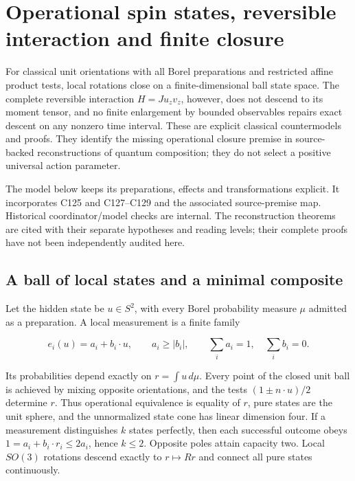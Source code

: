 \documentclass[11pt,a4paper]{article}
\begin{document}
\hypertarget{operational-spin-states-reversible-interaction-and-finite-closure}{%
\section{Operational spin states, reversible interaction and finite
closure}\label{operational-spin-states-reversible-interaction-and-finite-closure}}

For classical unit orientations with all Borel preparations and
restricted affine product tests, local rotations close on a
finite-dimensional ball state space. The complete reversible interaction
\(H=J u_zv_z\), however, does not descend to its moment tensor, and no
finite enlargement by bounded observables repairs exact descent on any
nonzero time interval. These are explicit classical countermodels and
proofs. They identify the missing operational closure premise in
source-backed reconstructions of quantum composition; they do not select
a positive universal action parameter.

The model below keeps its preparations, effects and transformations
explicit. It incorporates C125 and C127--C129 and the associated
source-premise map. Historical coordinator/model checks are internal.
The reconstruction theorems are cited with their separate hypotheses and
reading levels; their complete proofs have not been independently
audited here.

\hypertarget{a-ball-of-local-states-and-a-minimal-composite}{%
\subsection{A ball of local states and a minimal
composite}\label{a-ball-of-local-states-and-a-minimal-composite}}

Let the hidden state be \(u\in S^2\), with every Borel probability
measure \(\mu\) admitted as a preparation. A local measurement is a
finite family

\[e_i(u)=a_i+b_i\cdot u,\qquad a_i\ge|b_i|,\qquad
\sum_i a_i=1,\quad\sum_i b_i=0.\]

Its probabilities depend exactly on \(r=\int u\,d\mu\). Every point of
the closed unit ball is achieved by mixing opposite orientations, and
the tests \((1\pm n\cdot u)/2\) determine \(r\). Thus operational
equivalence is equality of \(r\), pure states are the unit sphere, and
the unnormalized state cone has linear dimension four. If a measurement
distinguishes \(k\) states perfectly, then each successful outcome obeys
\(1=a_i+b_i\cdot r_i\le2a_i\), hence \(k\le2\). Opposite poles attain
capacity two. Local \(SO(3)\) rotations descend exactly to
\(r\mapsto Rr\) and connect all pure states continuously.
\end{document}
